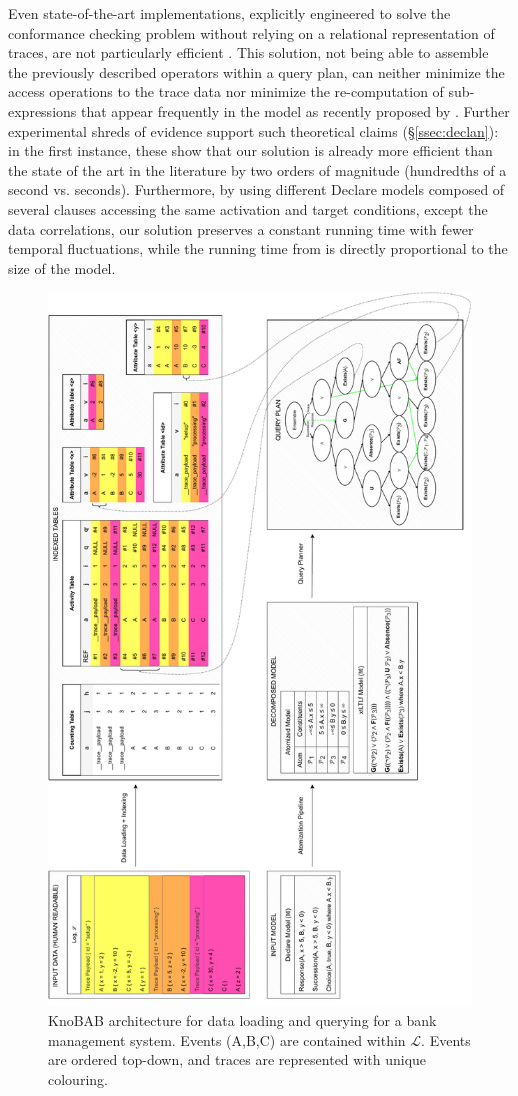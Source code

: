 Even state-of-the-art implementations, explicitly engineered to solve the conformance checking problem without relying on a 
relational representation of traces, are not particularly efficient \cite{BurattinMS16}. This solution, not being able to assemble the previously described \LTLf operators within a query plan, can neither minimize the access operations to the trace data nor  minimize the re-computation of sub-expressions that appear frequently in the model as recently proposed by \cite{BellatrecheKB21}. Further experimental shreds of evidence support such theoretical claims (\S\ref{ssec:declan}): in the first instance, these show that our solution is already more efficient than the state of the art in the literature by two orders of magnitude (hundredths of a second vs. seconds). Furthermore, by using different Declare models composed of several clauses accessing the same activation and target conditions, except the data correlations, our solution preserves a constant running time with fewer temporal fluctuations, while the running time from  \cite{BurattinMS16} is directly proportional to the size of the model.

\begin{figure}[!t]
	\centering
	\includegraphics[width=.7\textwidth]{images/knobab_pipeline.pdf}
	\caption{KnoBAB architecture for data loading and querying for a bank management system. Events (A,B,C) are contained within $\mathcal{L}$. Events are ordered top-down, and traces are represented with unique colouring. } \label{fig:knobab_pipeline}
\end{figure}

